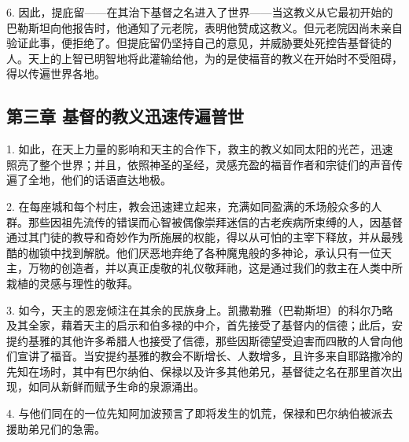 \par

6. 因此，提庇留——在其治下基督之名进入了世界——当这教义从它最初开始的巴勒斯坦向他报告时，他通知了元老院，表明他赞成这教义。但元老院因尚未亲自验证此事，便拒绝了。但提庇留仍坚持自己的意见，并威胁要处死控告基督徒的人。天上的上智已明智地将此灌输给他，为的是使福音的教义在开始时不受阻碍，得以传遍世界各地。\par


\subsection{第三章 基督的教义迅速传遍普世}

1. 如此，在天上力量的影响和天主的合作下，救主的教义如同太阳的光芒，迅速照亮了整个世界；并且，依照神圣的圣经，灵感充盈的福音作者和宗徒们的声音传遍了全地，他们的话语直达地极。\par

2. 在每座城和每个村庄，教会迅速建立起来，充满如同盈满的禾场般众多的人群。那些因祖先流传的错误而心智被偶像崇拜迷信的古老疾病所束缚的人，因基督通过其门徒的教导和奇妙作为所施展的权能，得以从可怕的主宰下释放，并从最残酷的枷锁中找到解脱。他们厌恶地弃绝了各种魔鬼般的多神论，承认只有一位天主，万物的创造者，并以真正虔敬的礼仪敬拜祂，这是通过我们的救主在人类中所栽植的灵感与理性的敬拜。\par

3. 如今，天主的恩宠倾注在其余的民族身上。凯撒勒雅（巴勒斯坦）的科尔乃略及其全家，藉着天主的启示和伯多禄的中介，首先接受了基督内的信德；此后，安提约基雅的其他许多希腊人也接受了信德，那些因斯德望受迫害而四散的人曾向他们宣讲了福音。当安提约基雅的教会不断增长、人数增多，且许多来自耶路撒冷的先知在场时，其中有巴尔纳伯、保禄以及许多其他弟兄，基督徒之名在那里首次出现，如同从新鲜而赋予生命的泉源涌出。\par

4. 与他们同在的一位先知阿加波预言了即将发生的饥荒，保禄和巴尔纳伯被派去援助弟兄们的急需。\par


